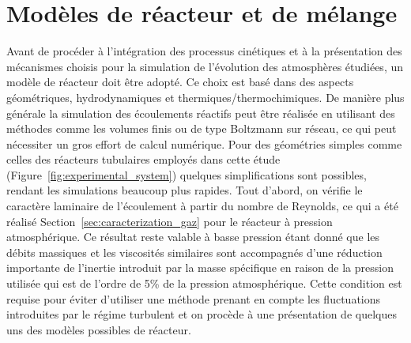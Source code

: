 \vfill\clearpage

\section{Modèles de réacteur et de mélange}
\label{sec:modeles-reacteur}

Avant de procéder à l'intégration des processus cinétiques et à la présentation des mécanismes choisis pour la simulation de l'évolution des atmosphères étudiées, un modèle de réacteur doit être adopté. Ce choix est basé dans des aspects géométriques, hydrodynamiques et thermiques/thermochimiques. De manière plus générale la simulation des écoulements réactifs peut être réalisée en utilisant des méthodes comme les volumes finis ou de type Boltzmann sur réseau, ce qui peut nécessiter un gros effort de calcul numérique. Pour des géométries simples comme celles des réacteurs tubulaires employés dans cette étude (Figure~\ref{fig:experimental_system}) quelques simplifications sont possibles, rendant les simulations beaucoup plus rapides. Tout d'abord, on vérifie le caractère laminaire de l'écoulement à partir du nombre de Reynolds, ce qui a été réalisé Section~\ref{sec:caracterization_gaz} pour le réacteur à pression atmosphérique. Ce résultat reste valable à basse pression étant donné que les débits massiques et les viscosités similaires sont accompagnés d'une réduction importante de l'inertie \textendash{} introduit par la masse spécifique \textendash{} en raison de la pression utilisée qui est de l'ordre de 5\% de la pression atmosphérique. Cette condition est requise pour éviter d'utiliser une méthode prenant en compte les fluctuations introduites par le régime turbulent et on procède à une présentation de quelques uns des modèles possibles de réacteur. 

